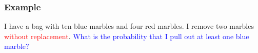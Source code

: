 \begin{frame}
  \frametitle{Example}

  I have a bag with ten blue marbles and four red marbles. I remove
  two marbles \textcolor<2->{red}{without
    replacement}. \textcolor<2->{blue}{What is the probability that I
    pull out at least one blue marble?}


  \vfill

\end{frame}



